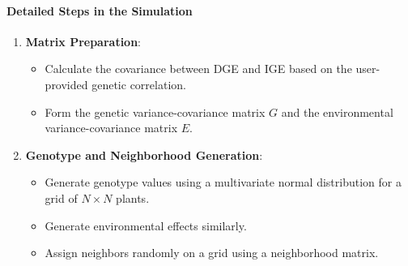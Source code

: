 \documentclass[
]{article}
\newenvironment{Shaded}{\begin{snugshade}}{\end{snugshade}}
\newcommand{\AttributeTok}[1]{\textcolor[rgb]{0.13,0.29,0.53}{#1}}
\newcommand{\ConstantTok}[1]{\textcolor[rgb]{0.56,0.35,0.01}{#1}}
\newcommand{\DecValTok}[1]{\textcolor[rgb]{0.00,0.00,0.81}{#1}}
\newcommand{\FloatTok}[1]{\textcolor[rgb]{0.00,0.00,0.81}{#1}}
\newcommand{\FunctionTok}[1]{\textcolor[rgb]{0.13,0.29,0.53}{\textbf{#1}}}
\newcommand{\NormalTok}[1]{#1}
\newcommand{\OtherTok}[1]{\textcolor[rgb]{0.56,0.35,0.01}{#1}}
\newcommand{\SpecialCharTok}[1]{\textcolor[rgb]{0.81,0.36,0.00}{\textbf{#1}}}
\providecommand{\tightlist}{%
  \setlength{\itemsep}{0pt}\setlength{\parskip}{0pt}}
\begin{document}
\paragraph{Detailed Steps in the
Simulation}\label{detailed-steps-in-the-simulation}

\begin{enumerate}
\def\labelenumi{\arabic{enumi}.}
\tightlist
\item
  \textbf{Matrix Preparation}:

  \begin{itemize}
  \tightlist
  \item
    Calculate the covariance between DGE and IGE based on the
    user-provided genetic correlation.
  \item
    Form the genetic variance-covariance matrix \(G\) and the
    environmental variance-covariance matrix \(E\).
  \end{itemize}

\begin{Shaded}
\end{Shaded}
\item
  \textbf{Genotype and Neighborhood Generation}:

  \begin{itemize}
  \tightlist
  \item
    Generate genotype values using a multivariate normal distribution
    for a grid of \(N \times N\) plants.
  \item
    Generate environmental effects similarly.
  \item
    Assign neighbors randomly on a grid using a neighborhood matrix.
  \end{itemize}


\end{enumerate}
\end{document}
